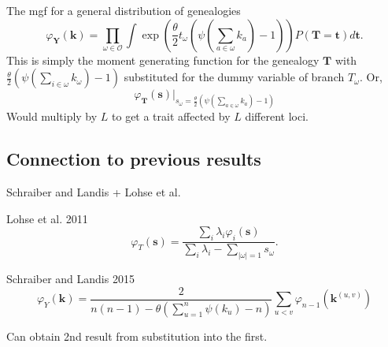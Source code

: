 \documentclass{beamer}
\begin{document}
\begin{frame}{The mgf for a general distribution of genealogies}
  \begin{equation*}
    \varphi_{\mathbf{Y}}(\mathbf{k}) = \prod_{\omega \in \mathcal{O}}
    \int \exp\left( \frac{\theta}{2} t_{\omega} \left( \psi\left(\sum_{a \in \omega}k_{a}\right) -1 \right)\right)
    P(\mathbf{T}=\mathbf{t})d\mathbf{t}.
  \end{equation*}
  This is simply the moment generating function for the genealogy
  $\mathbf{T}$ with $\frac{\theta}{2} \left( \psi(\sum_{i \in
      \omega}k_{\omega}) -1 \right)$ substituted for the dummy variable of
  branch $T_{\omega}$. Or,
  \begin{equation*}
    \label{eq:sub}
    \varphi_{\mathbf{T}}(\mathbf{s})\Bigr|_{s_{\omega}=\frac{\theta}{2} \left( \psi\left(\sum_{a \in \omega}k_{a}\right) -1 \right)}
  \end{equation*}
  Would multiply by $L$ to get a trait affected by $L$ different loci.
\end{frame}

\subsection{Connection to previous results}

\begin{frame}{Schraiber and Landis + Lohse et al.}
  \begin{block}{Lohse et al. 2011}
    \begin{equation*}
      \varphi_{T}\left( \mathbf{s} \right) = \frac{
        \sum_i \lambda_i \varphi_i(\mathbf{s})}{
        \sum_i \lambda_i - \sum_{|\omega|=1}s_{\omega}}.
    \end{equation*}
  \end{block}
  \begin{block}{Schraiber and Landis 2015}
    \begin{equation*}
      \varphi_{Y}\left( \mathbf{k} \right) = \frac{2}{
        n(n-1) - \theta \left( \sum_{u=1}^n \psi(k_u) - n\right)} \sum_{u<v}\varphi_{n-1}(\mathbf{k}^{(u,v)})
    \end{equation*}
  \end{block}
  Can obtain 2nd result from substitution into the first.
\end{frame}
\end{document}
